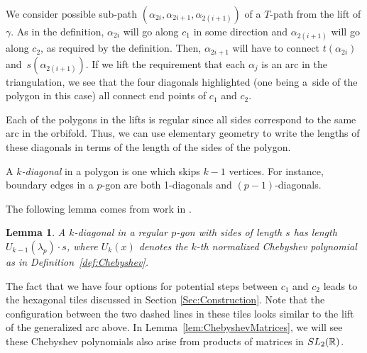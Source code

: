 \documentclass[11pt]{article}
\newcommand{\Real}{\mathbb{R}}
\numberwithin{equation}{section}
\newtheorem{Lemma}[Theorem]{Lemma}
\begin{document}
\begin{center}
\end{center}

We consider possible sub-path $(\alpha_{2i},\alpha_{2i+1}, \alpha_{2(i+1)})$ of a $T$-path from the lift of $\gamma$. As in the definition, $\alpha_{2i}$ will go along $c_1$ in some direction and $\alpha_{2(i+1)}$ will go along $c_2$, as required by the definition. Then, $\alpha_{2i+1}$ will have to connect $t(\alpha_{2i})$ and~$s(\alpha_{2(i+1)})$. If we lift the requirement that each $\alpha_j$ is an arc in the triangulation, we see that the four diagonals highlighted (one being a~side of the polygon in this case) all connect end points of $c_1$ and $c_2$.

Each of the polygons in the lifts is regular since all sides correspond to the same arc in the orbifold. Thus, we can use elementary geometry to write the lengths of these diagonals in terms of the length of the sides of the polygon.

\begin{Definition}\label{def:kdiagonal}
A \emph{$k$-diagonal} in a polygon is one which skips $k-1$ vertices. For instance, boundary edges in a $p$-gon are both 1-diagonals and $(p-1)$-diagonals.
\end{Definition}

The following lemma comes from work in \cite{Lang}.

\begin{Lemma} \label{lem:polygonlength}
A $k$-diagonal in a regular $p$-gon with sides of length $s$ has length $U_{k-1}(\lambda_p) \cdot s$, where $U_k(x)$ denotes the $k$-th normalized Chebyshev polynomial as in Definition~{\rm \ref{def:Chebyshev}}.
\end{Lemma}

The fact that we have four options for potential steps between $c_1$ and $c_2$ leads to the hexagonal tiles discussed in Section \ref{Sec:Construction}. Note that the configuration between the two dashed lines in these tiles looks similar to the lift of the generalized arc above. In Lemma~\ref{lem:ChebyshevMatrices}, we will see these Chebyshev polynomials also arise from products of matrices in ${\rm SL}_2(\Real)$.
\end{document}
